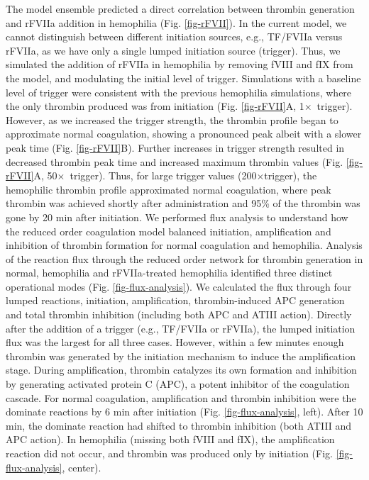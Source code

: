 \documentclass[12pt]{article}
\begin{document}
The model ensemble predicted a direct correlation between thrombin generation and rFVIIa addition in hemophilia (Fig. \ref{fig-rFVII}).
In the current model, we cannot distinguish between different initiation sources, e.g., TF/FVIIa versus rFVIIa, as we have only a single lumped initiation source (trigger).
Thus, we simulated the addition of rFVIIa in hemophilia by removing fVIII and fIX from the model, and modulating the initial level of trigger.
Simulations with a baseline level of trigger were consistent with the previous hemophilia simulations, where the only thrombin produced was from initiation (Fig. \ref{fig-rFVII}A, 1$\times$~trigger).
However, as we increased the trigger strength, the thrombin profile began to approximate normal coagulation, showing a pronounced peak albeit with a slower peak time (Fig. \ref{fig-rFVII}B).
Further increases in trigger strength resulted in decreased thrombin peak time and increased maximum thrombin values (Fig. \ref{fig-rFVII}A, 50$\times$~trigger). 
Thus, for large trigger values (200$\times$trigger), the hemophilic thrombin profile approximated normal coagulation, where peak thrombin was achieved shortly 
after administration and 95\% of the thrombin was gone by 20 min after initiation. 
We performed flux analysis to understand how the reduced order coagulation model balanced initiation, amplification and inhibition of thrombin formation for normal coagulation and hemophilia.
Analysis of the reaction flux through the reduced order network for thrombin generation in normal, hemophilia and rFVIIa-treated hemophilia identified three distinct operational modes (Fig. \ref{fig-flux-analysis}).
We calculated the flux through four lumped reactions, initiation, amplification, thrombin-induced APC generation and total thrombin inhibition (including both APC and ATIII action).
Directly after the addition of a trigger (e.g., TF/FVIIa or rFVIIa), the lumped initiation flux was the largest for all three cases.
However, within a few minutes enough thrombin was generated by the initiation mechanism to induce the amplification stage. 
During amplification, thrombin catalyzes its own formation and inhibition by generating activated protein C (APC), a potent inhibitor of the coagulation cascade.
For normal coagulation, amplification and thrombin inhibition were the dominate reactions by 6 min after initiation (Fig. \ref{fig-flux-analysis}, left). 
After 10 min, the dominate reaction had shifted to thrombin inhibition (both ATIII and APC action). 
In hemophilia (missing both fVIII and fIX), the amplification reaction did not occur, and thrombin was produced only by initiation (Fig. \ref{fig-flux-analysis}, center).
\end{document}
